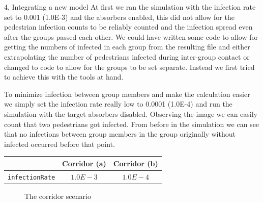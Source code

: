 \begin{task}{4, Integrating a new model}
At first we ran the simulation with the infection rate set to 0.001 (1.0E-3) and the absorbers enabled, this did not allow for the pedestrian infection counts to be reliably counted and the infection spread even after the groups passed each other. We could have written some code to allow for getting the numbers of infected in each group from the resulting file and either extrapolating the number of pedestrians infected during inter-group contact or changed to code to allow for the groups to be set separate. Instead we first tried to achieve this with the tools at hand.

To minimize infection between group members and make the calculation easier we simply set the infection rate really low to 0.0001 (1.0E-4) and run the simulation with the target absorbers disabled. Observing the image we can easily count that two pedestrians got infected. From before in the simulation we can see that no infections between group members in the group originally without infected occurred before that point.

\begin{center}
\begin{tabular}{ |c|c|c| } 
 \hline
& Corridor (a) & Corridor (b) \\
\hline
\verb+infectionRate+ & $1.0E-3$ & $1.0E-4$ \\
\hline
\end{tabular}
\end{center}
\begin{figure}[H]
\centering
{}
\caption{The corridor scenario}
\label{fig:corridor}
\end{figure}


\end{task}
